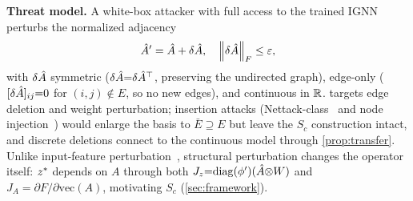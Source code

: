 \textbf{Threat model.} A white-box attacker with full access to the trained IGNN perturbs the normalized adjacency
\begin{equation}
\hat{A}' = \hat{A} + \delta \hat{A}, \quad \left\|\delta \hat{A}\right\|_F \leq \varepsilon,
\label{eq:threat}
\end{equation}
with $\delta\hat{A}$ symmetric ($\delta\hat{A}{=}\delta\hat{A}^\top$, preserving the undirected graph), edge-only ($[\delta\hat{A}]_{ij}{=}0$ for $(i,j)\notin E$, so no new edges), and continuous in $\mathbb{R}$. \AEGIS targets edge deletion and weight perturbation; insertion attacks (Nettack-class~\cite{zugner2018adversarial,zugner2019adversarial} and node injection~\cite{sun2020nipa}) would enlarge the basis to $\bar E \supseteq E$ but leave the $S_c$ construction intact, and discrete deletions connect to the continuous model through \cref{prop:transfer}. Unlike input-feature perturbation~\cite{el2021implicit,revay2020lipschitz}, structural perturbation changes the operator itself: $z^{*}$ depends on $A$ through both $J_z{=}\mathrm{diag}(\phi')(\hat{A}{\otimes}W)$ and $J_A{=}\partial F/\partial\mathrm{vec}(A)$, motivating $S_c$ (\cref{sec:framework}).

